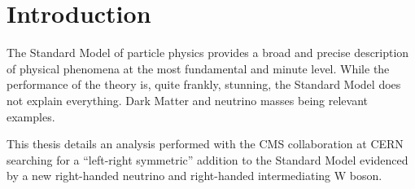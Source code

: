 \chapter{Introduction}
\label{ch:intro}
The Standard Model of particle physics provides a broad and precise description of physical phenomena at the most fundamental and minute level.  While the performance of the theory is, quite frankly, stunning, the Standard Model does not explain everything.  Dark Matter and neutrino masses being relevant examples.

This thesis details an analysis performed with the CMS collaboration at CERN searching for a ``left-right symmetric'' addition to the Standard Model evidenced by a new right-handed neutrino and right-handed intermediating W boson.

